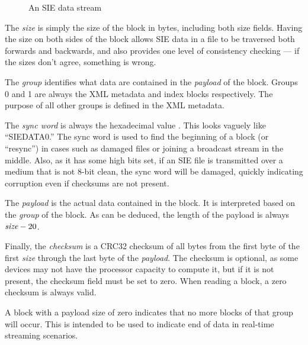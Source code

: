 \documentclass{article}
\begin{document}
\begin{figure}
  \blockstructure
  \caption{An SIE data stream}  \label{data-stream-fig}
\end{figure}

The \emph{size} is simply the size of the block in bytes, including
both size fields.  Having the size on both sides of the block allows
SIE data in a file to be traversed both forwards and backwards, and
also provides one level of consistency checking --- if the sizes don't
agree, something is wrong.

The \emph{group} identifies what data are contained in the
\emph{payload} of the block.  Groups 0 and 1 are always the XML
metadata and index blocks respectively.  The purpose of all other
groups is defined in the XML metadata.

The \emph{sync word} is always the hexadecimal value
.  This looks vaguely like ``SIEDATA0.''  The sync
word is used to find the beginning of a block (or ``resync'') in cases
such as damaged files or joining a broadcast stream in the middle.
Also, as it has some high bits set, if an SIE file is transmitted over
a medium that is not 8-bit clean, the sync word will be damaged,
quickly indicating corruption even if checksums are not present.

The \emph{payload} is the actual data contained in the block.  It is
interpreted based on the \emph{group} of the block.  As can be
deduced, the length of the payload is always $\emph{size} - 20$.

Finally, the \emph{checksum} is a CRC32 checksum of all bytes from the
first byte of the first \emph{size} through the last byte of the
\emph{payload}.  The checksum is optional, as some devices may not
have the processor capacity to compute it, but if it is not present,
the checksum field must be set to zero.  When reading a block, a zero
checksum is always valid.

A block with a payload size of zero indicates that no more blocks of
that group will occur.  This is intended to be used to indicate end of
data in real-time streaming scenarios.
\end{document}

